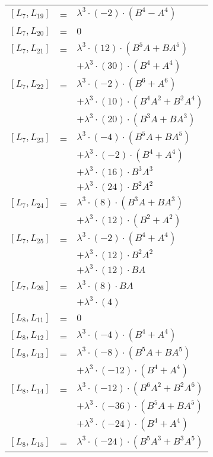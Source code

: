 \documentclass{article}
\begin{document}
\begin{center}
\begin{longtable}{lll}
$[L_{7},L_{19}]$ & = & ${\lambda}^3{\cdot}(-2){\cdot}(B^{4}-A^{4})$ \\
$[L_{7},L_{20}]$ & = & $ 0 $ \\
$[L_{7},L_{21}]$ & = & ${\lambda}^3{\cdot}(12){\cdot}(B^{5}A+BA^{5})$ \\*
 & & $ + {\lambda}^3{\cdot}(30){\cdot}(B^{4}+A^{4})$ \\
$[L_{7},L_{22}]$ & = & ${\lambda}^3{\cdot}(-2){\cdot}(B^{6}+A^{6})$ \\*
 & & $ + {\lambda}^3{\cdot}(10){\cdot}(B^{4}A^{2}+B^{2}A^{4})$ \\*
 & & $ + {\lambda}^3{\cdot}(20){\cdot}(B^{3}A+BA^{3})$ \\
$[L_{7},L_{23}]$ & = & ${\lambda}^3{\cdot}(-4){\cdot}(B^{5}A+BA^{5})$ \\*
 & & $ + {\lambda}^3{\cdot}(-2){\cdot}(B^{4}+A^{4})$ \\*
 & & $ + {\lambda}^3{\cdot}(16){\cdot}B^{3}A^{3}$ \\*
 & & $ + {\lambda}^3{\cdot}(24){\cdot}B^{2}A^{2}$ \\
$[L_{7},L_{24}]$ & = & ${\lambda}^3{\cdot}(8){\cdot}(B^{3}A+BA^{3})$ \\*
 & & $ + {\lambda}^3{\cdot}(12){\cdot}(B^{2}+A^{2})$ \\
$[L_{7},L_{25}]$ & = & ${\lambda}^3{\cdot}(-2){\cdot}(B^{4}+A^{4})$ \\*
 & & $ + {\lambda}^3{\cdot}(12){\cdot}B^{2}A^{2}$ \\*
 & & $ + {\lambda}^3{\cdot}(12){\cdot}BA$ \\
$[L_{7},L_{26}]$ & = & ${\lambda}^3{\cdot}(8){\cdot}BA$ \\*
 & & $ + {\lambda}^3{\cdot}(4)$ \\
$[L_{8},L_{11}]$ & = & $ 0 $ \\
$[L_{8},L_{12}]$ & = & ${\lambda}^3{\cdot}(-4){\cdot}(B^{4}+A^{4})$ \\
$[L_{8},L_{13}]$ & = & ${\lambda}^3{\cdot}(-8){\cdot}(B^{5}A+BA^{5})$ \\*
 & & $ + {\lambda}^3{\cdot}(-12){\cdot}(B^{4}+A^{4})$ \\
$[L_{8},L_{14}]$ & = & ${\lambda}^3{\cdot}(-12){\cdot}(B^{6}A^{2}+B^{2}A^{6})$ \\*
 & & $ + {\lambda}^3{\cdot}(-36){\cdot}(B^{5}A+BA^{5})$ \\*
 & & $ + {\lambda}^3{\cdot}(-24){\cdot}(B^{4}+A^{4})$ \\
$[L_{8},L_{15}]$ & = & ${\lambda}^3{\cdot}(-24){\cdot}(B^{5}A^{3}+B^{3}A^{5})$ \\*

\end{longtable}
\end{center}
\end{document}
